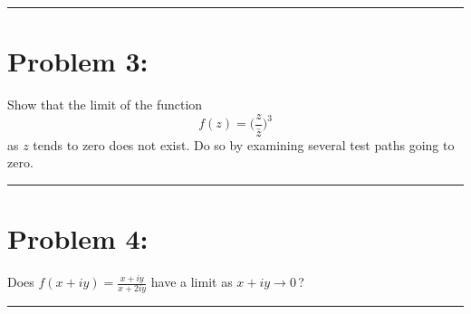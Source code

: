 \documentclass{article}
\begin{document}
\vspace{.5cm} %

\hrule

\newpage
\section*{Problem 3: }
Show that the limit of the function 
		\[ f(z) =\Big( \frac{z}{\bar{z}} \Big)^3\]
		as $z$ tends to zero does not exist. Do so by examining several test paths going to zero.
		
\vspace{.5cm} %

\hrule

\newpage
\section*{Problem 4: }
Does $f(x+iy)=\displaystyle{\frac{x+iy}{x+2iy}}$ have a limit as $x+iy \to 0$\,?

\vspace{.5cm} %

\hrule
\end{document}
